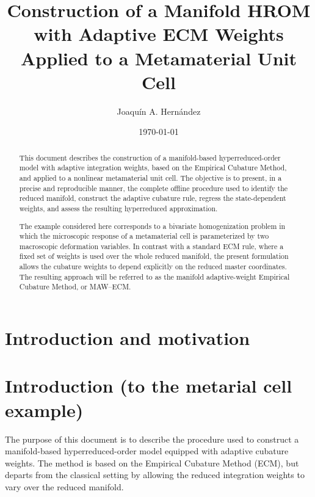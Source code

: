 \documentclass[11pt,a4paper]{article}
\title{Construction of a Manifold HROM with Adaptive ECM Weights\\
Applied to a Metamaterial Unit Cell}
\author{Joaquín A. Hernández}
\date{\today}
\newcommand{\PROMPT}[1]{ }
\begin{document}
\maketitle


\begin{abstract}
This document describes the construction of a manifold-based hyperreduced-order model
with adaptive integration weights, based on the Empirical Cubature Method, and applied
to a nonlinear metamaterial unit cell. The objective is to present, in a precise and
reproducible manner, the complete offline procedure used to identify the reduced
manifold, construct the adaptive cubature rule, regress the state-dependent weights, and
assess the resulting hyperreduced approximation.

The example considered here corresponds to a bivariate homogenization problem in which
the microscopic response of a metamaterial cell is parameterized by two macroscopic
deformation variables. In contrast with a standard ECM rule, where a fixed set of
weights is used over the whole reduced manifold, the present formulation allows the
cubature weights to depend explicitly on the reduced master coordinates. The resulting
approach will be referred to as the manifold adaptive-weight Empirical Cubature Method,
or MAW--ECM.
\end{abstract}

\section{Introduction and motivation}

\PROMPT{}



\section{Introduction (to the metarial cell example)}

The purpose of this document is to describe the procedure used to construct a
manifold-based hyperreduced-order model equipped with adaptive cubature weights. The
method is based on the Empirical Cubature Method (ECM), but departs from the classical
setting by allowing the reduced integration weights to vary over the reduced manifold.
\end{document}
